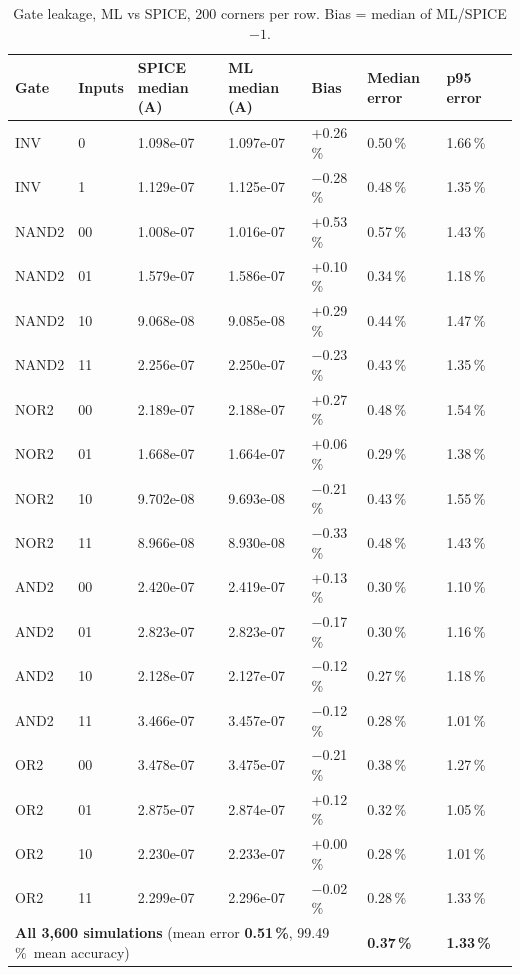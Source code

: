 \documentclass[11pt,a4paper]{article}
\newcommand{\pct}{\,\%}
\begin{document}
\begin{table}[H]
\centering
\caption{Gate leakage, ML vs SPICE, 200 corners per row. Bias = median of ML/SPICE $- 1$.}
\label{tab:gates}
\small
\begin{tabular}{llllllll}
\toprule
Gate & Inputs & SPICE median (A) & ML median (A) & Bias & Median error & p95 error \\
\midrule
INV & 0 & 1.098e-07 & 1.097e-07 & +0.26\pct & 0.50\pct & 1.66\pct \\
INV & 1 & 1.129e-07 & 1.125e-07 & $-$0.28\pct & 0.48\pct & 1.35\pct \\
\addlinespace
NAND2 & 00 & 1.008e-07 & 1.016e-07 & +0.53\pct & 0.57\pct & 1.43\pct \\
NAND2 & 01 & 1.579e-07 & 1.586e-07 & +0.10\pct & 0.34\pct & 1.18\pct \\
NAND2 & 10 & 9.068e-08 & 9.085e-08 & +0.29\pct & 0.44\pct & 1.47\pct \\
NAND2 & 11 & 2.256e-07 & 2.250e-07 & $-$0.23\pct & 0.43\pct & 1.35\pct \\
\addlinespace
NOR2 & 00 & 2.189e-07 & 2.188e-07 & +0.27\pct & 0.48\pct & 1.54\pct \\
NOR2 & 01 & 1.668e-07 & 1.664e-07 & +0.06\pct & 0.29\pct & 1.38\pct \\
NOR2 & 10 & 9.702e-08 & 9.693e-08 & $-$0.21\pct & 0.43\pct & 1.55\pct \\
NOR2 & 11 & 8.966e-08 & 8.930e-08 & $-$0.33\pct & 0.48\pct & 1.43\pct \\
\addlinespace
AND2 & 00 & 2.420e-07 & 2.419e-07 & +0.13\pct & 0.30\pct & 1.10\pct \\
AND2 & 01 & 2.823e-07 & 2.823e-07 & $-$0.17\pct & 0.30\pct & 1.16\pct \\
AND2 & 10 & 2.128e-07 & 2.127e-07 & $-$0.12\pct & 0.27\pct & 1.18\pct \\
AND2 & 11 & 3.466e-07 & 3.457e-07 & $-$0.12\pct & 0.28\pct & 1.01\pct \\
\addlinespace
OR2 & 00 & 3.478e-07 & 3.475e-07 & $-$0.21\pct & 0.38\pct & 1.27\pct \\
OR2 & 01 & 2.875e-07 & 2.874e-07 & +0.12\pct & 0.32\pct & 1.05\pct \\
OR2 & 10 & 2.230e-07 & 2.233e-07 & +0.00\pct & 0.28\pct & 1.01\pct \\
OR2 & 11 & 2.299e-07 & 2.296e-07 & $-$0.02\pct & 0.28\pct & 1.33\pct \\
\midrule
\multicolumn{5}{l}{\textbf{All 3,600 simulations} (mean error \textbf{0.51\pct}, 99.49\pct\ mean accuracy)} & \textbf{0.37\pct} & \textbf{1.33\pct} \\
\bottomrule
\end{tabular}
\end{table}
\end{document}
